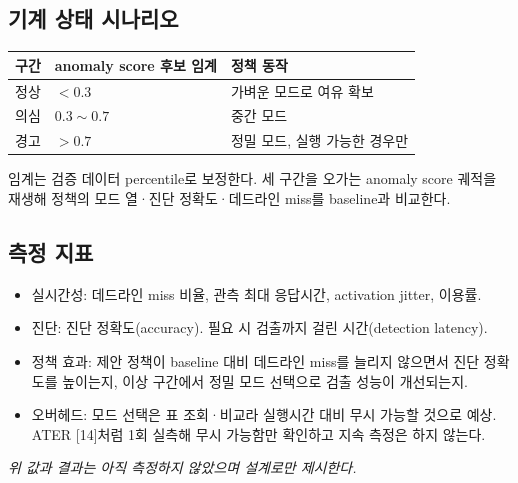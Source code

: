 \documentclass[10pt]{article}
\begin{document}
\subsection{기계 상태 시나리오}
\begin{center}\footnotesize
\begin{tabular}{@{}lll@{}}
\toprule
구간 & anomaly score 후보 임계 & 정책 동작 \\ \midrule
정상 & $<0.3$ & 가벼운 모드로 여유 확보 \\
의심 & $0.3\sim0.7$ & 중간 모드 \\
경고 & $>0.7$ & 정밀 모드, 실행 가능한 경우만 \\
\bottomrule
\end{tabular}
\end{center}
\noindent 임계는 검증 데이터 percentile로 보정한다. 세 구간을 오가는 anomaly score 궤적을 재생해 정책의 모드 열·진단 정확도·데드라인 miss를 baseline과 비교한다.

\subsection{측정 지표}
\begin{itemize}
\item 실시간성: 데드라인 miss 비율, 관측 최대 응답시간, activation jitter, 이용률.
\item 진단: 진단 정확도(accuracy). 필요 시 검출까지 걸린 시간(detection latency).
\item 정책 효과: 제안 정책이 baseline 대비 데드라인 miss를 늘리지 않으면서 진단 정확도를 높이는지, 이상 구간에서 정밀 모드 선택으로 검출 성능이 개선되는지.
\item 오버헤드: 모드 선택은 표 조회·비교라 실행시간 대비 무시 가능할 것으로 예상. ATER [14]처럼 1회 실측해 무시 가능함만 확인하고 지속 측정은 하지 않는다.
\end{itemize}
\noindent\emph{위 값과 결과는 아직 측정하지 않았으며 설계로만 제시한다.}
\end{document}
